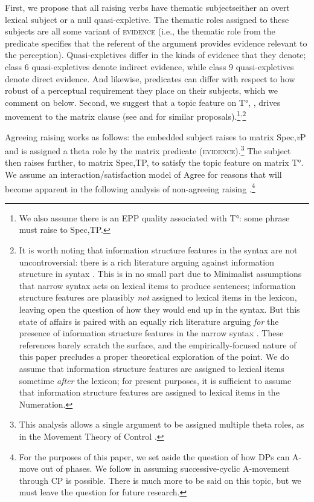 \documentclass[output=paper,colorlinks,citecolor=brown
]{langscibook}
\begin{document}
First, we propose that all raising verbs have thematic subjects\textemdash either an overt lexical subject or a null quasi-expletive. The thematic roles assigned to these subjects are all some variant of \textsc{evidence} (i.e., the thematic role from the predicate specifies that the referent of the argument provides evidence relevant to the perception). Quasi-expletives differ in the kinds of evidence that they denote; class 6 quasi-expletives denote indirect evidence, while class 9 quasi-expletives denote direct evidence. And likewise, predicates can differ with respect to how robust of a perceptual requirement they place on their subjects, which we comment on below. Second, we suggest that a topic feature on T°, \topFeat, drives movement to the matrix clause (see \citealt{Grishin2018ZuluCPs} and \citealt{Greeson2023EnglishHr} for similar proposals).\footnote{We also assume there is an EPP quality associated with T°: some phrase must raise to Spec,TP.}\textsuperscript{,}\footnote{It is worth noting that information structure features in the syntax are not uncontroversial: there is a rich literature arguing against information structure in syntax \citep{Fanselow2006PureSyntax,NeelemanVanDeKoot2008DutchScrambling,Horvath2010StrongModularity}. This is in no small part due to Minimalist assumptions that narrow syntax acts on lexical items to produce sentences; information structure features are plausibly \textit{not} assigned to lexical items in the lexicon, leaving open the question of how they would end up in the syntax. But this state of affairs is paired with an equally rich literature arguing \textit{for} the presence of information structure features in the narrow syntax \citep{Rizzi1997LeftPeriphery,Kallulli:2008:CliticsInfoStrucAlbanian,Aboh2010InfoStrucNumeration,KratzerSelkirk2020InfoStruc}. These references barely scratch the surface, and the empirically-focused nature of this paper precludes a proper theoretical exploration of the point. We do assume that information structure features are assigned to lexical items sometime \textit{after} the lexicon; for present purposes, it is sufficient to assume that information structure features are assigned to lexical items in the Numeration.} 

Agreeing raising works as follows: the embedded subject  raises to matrix Spec,\textit{v}P and is assigned a theta role by the matrix predicate (\textsc{evidence}).\footnote{This analysis allows a single argument to be assigned multiple theta roles, as in the Movement Theory of Control \citep{BoeckxHornsteinNunes:2010}.} The subject then raises further, to matrix Spec,TP, to satisfy the topic feature on matrix T°. We assume an interaction/satisfaction model of Agree for reasons that will become apparent in the following analysis of non-agreeing raising \citep{Deal2015IntSat}.\footnote{For the purposes of this paper, we set aside the question of how DPs can A-move out of phases. We follow \citet{Fong:2018:MongolianHyperRaising,Fong2019HyperRaisingGlossa} in assuming successive-cyclic A-movement through CP is possible. There is much more to be said on this topic, but we must leave the question for future research.}
\end{document}

